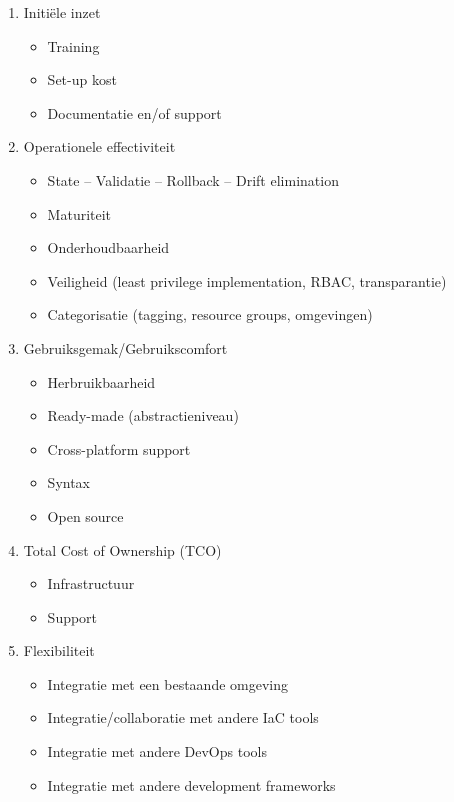 \begin{enumerate}
    \item Initiële inzet
    \begin{itemize}
        \item Training
        \item Set-up kost
        \item Documentatie en/of support
    \end{itemize}
    \item Operationele effectiviteit
    \begin{itemize}
        \item State – Validatie – Rollback – Drift elimination
        \item Maturiteit
        \item Onderhoudbaarheid
        \item Veiligheid (least privilege implementation, RBAC, transparantie)
        \item Categorisatie (tagging, resource groups, omgevingen)
    \end{itemize}
    \item Gebruiksgemak/Gebruikscomfort
    \begin{itemize}
        \item Herbruikbaarheid
        \item Ready-made (abstractieniveau)
        \item Cross-platform support
        \item Syntax
        \item Open source
    \end{itemize}
    \item Total Cost of Ownership (TCO)
    \begin{itemize}
        \item Infrastructuur
        \item Support
    \end{itemize}
    \item Flexibiliteit
    \begin{itemize}
        \item Integratie met een bestaande omgeving
        \item Integratie/collaboratie met andere IaC tools
        \item Integratie met andere DevOps tools
        \item Integratie met andere development frameworks
    \end{itemize}
\end{enumerate}

